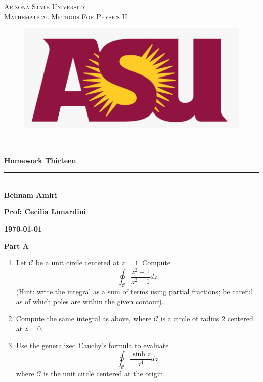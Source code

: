 \documentclass[fleqn]{article}
\begin{document}
  \begin{titlepage}

    \newcommand{\HRule}{\rule{\linewidth}{0.5mm}}

    \center


    \textsc{\LARGE Arizona State University}\\[1.5cm]

    \textsc{\LARGE Mathematical Methods For Physics II }\\[1.5cm]


    \begin{figure}
      \includegraphics[width=\linewidth]{asu.png}
    \end{figure}


    \HRule \\[0.4cm]
    { \huge \bfseries Homework Thirteen}\\[0.4cm] 
    \HRule \\[1.5cm]

    \textbf{Behnam Amiri}

    \bigbreak

    \textbf{Prof: Cecilia Lunardini}

    \bigbreak


    \textbf{{\large \today}\\[2cm]}

    \vfill

  \end{titlepage}

  \textbf{Part A}
  \begin{enumerate}
    \item Let ${\mathcal C}$ be a unit circle centered at $z = 1$. Compute
      $$
      \oint_{\mathcal C}   \frac{z^2 + 1}{z^2 - 1} dz
      $$
      (Hint: write the integral as a sum of terms using partial fractions; be careful as of which poles are within the given contour). 

      \item Compute the same integral as above, where ${\mathcal C}$ is a circle of radius 2 centered at $z = 0$.


      \item Use the generalized Cauchy's formula to evaluate
      $$
      \oint_{\mathcal C}   \frac{\sinh z}{z^4} dz
      $$
      where ${\mathcal C}$ is the unit circle centered at the origin.


  \end{enumerate}
\end{document}
